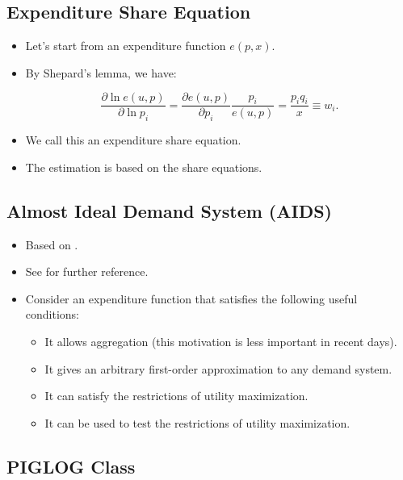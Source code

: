 \documentclass[]{book}
\providecommand{\tightlist}{%
  \setlength{\itemsep}{0pt}\setlength{\parskip}{0pt}}
\begin{document}
\subsection{Expenditure Share
Equation}\label{expenditure-share-equation}

\begin{itemize}
\tightlist
\item
  Let's start from an expenditure function \(e(p, x)\).
\item
  By Shepard's lemma, we have:

  \begin{equation}
  \frac{\partial \ln e(u, p)}{\partial \ln p_i} = \frac{\partial e(u, p)}{\partial p_i} \frac{p_i}{e(u, p)} = \frac{p_i q_i}{x} \equiv w_i.
  \end{equation}
\item
  We call this an expenditure share equation.
\item
  The estimation is based on the share equations.
\end{itemize}

\subsection{Almost Ideal Demand System
(AIDS)}\label{almost-ideal-demand-system-aids}

\begin{itemize}
\tightlist
\item
  Based on \citet{Deaton1980}.
\item
  See \citet{AngusDeaton1980} for further reference.
\item
  Consider an expenditure function that satisfies the following useful
  conditions:

  \begin{itemize}
  \tightlist
  \item
    It allows aggregation (this motivation is less important in recent
    days).
  \item
    It gives an arbitrary first-order approximation to any demand
    system.
  \item
    It can satisfy the restrictions of utility maximization.
  \item
    It can be used to test the restrictions of utility maximization.
  \end{itemize}
\end{itemize}

\subsection{PIGLOG Class}\label{piglog-class}
\end{document}
